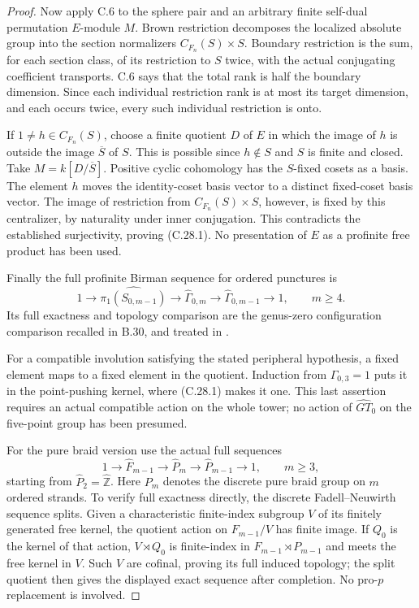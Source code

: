 \documentclass[11pt]{article}
\begin{document}
\begin{proof}
Now apply C.6 to the sphere pair and an arbitrary finite
self-dual permutation $E$-module $M$.  Brown restriction
decomposes the localized absolute group into the section
normalizers $C_{F_n}(S)\times S$.  Boundary restriction
is the sum, for each section class, of its restriction
to $S$ twice, with the actual conjugating coefficient
transports.  C.6 says that the total rank is half the
boundary dimension.  Since each individual restriction
rank is at most its target dimension, and each occurs
twice, every such individual restriction is onto.

If $1\ne h\in C_{F_n}(S)$, choose a finite quotient
$D$ of $E$ in which the image of $h$ is outside the
image $\overline S$ of $S$.  This is possible since
$h\notin S$ and $S$ is finite and closed.  Take
$M=k[D/\overline S]$.  Positive cyclic cohomology
has the $S$-fixed cosets as a basis.  The element $h$
moves the identity-coset basis vector to a distinct
fixed-coset basis vector.  The image of restriction
from $C_{F_n}(S)\times S$, however, is fixed by this
centralizer, by naturality under inner conjugation.
This contradicts the established surjectivity, proving
(C.28.1).  No presentation of $E$ as a profinite
free product has been used.

Finally the full profinite Birman sequence for ordered
punctures is
\[
 1\longrightarrow\widehat{\pi_1(S_{0,m-1})}
 \longrightarrow\widehat\Gamma_{0,m}
 \longrightarrow\widehat\Gamma_{0,m-1}
 \longrightarrow1,\qquad m\geq4 .
\]
Its full exactness and topology comparison are the
genus-zero configuration comparison recalled in B.30,
and treated in \cite{CEBoggiCongruence2020}.

For a compatible involution satisfying the stated
peripheral hypothesis, a fixed element maps to a
fixed element in the quotient.  Induction from
$\Gamma_{0,3}=1$ puts it in the point-pushing kernel,
where (C.28.1) makes it one.  This last assertion
requires an actual compatible action on the whole
tower; no action of $\widehat{GT}_0$ on the
five-point group has been presumed.

For the pure braid version use the actual full sequences
\[
 1\longrightarrow\widehat F_{m-1}
 \longrightarrow\widehat P_m
 \longrightarrow\widehat P_{m-1}
 \longrightarrow1,\qquad m\geq3,
\]
starting from $\widehat P_2=\widehat{\mathbb Z}$.
Here $P_m$ denotes the discrete pure braid group on
$m$ ordered strands.  To verify full exactness directly,
the discrete Fadell--Neuwirth sequence splits.  Given a
characteristic finite-index subgroup $V$ of its finitely
generated free kernel, the quotient action on $F_{m-1}/V$
has finite image.  If $Q_0$ is the kernel of that action,
$V\rtimes Q_0$ is finite-index in
$F_{m-1}\rtimes P_{m-1}$ and meets the free kernel in $V$.
Such $V$ are cofinal, proving its full induced topology;
the split quotient then gives the displayed exact sequence
after completion.  No pro-$p$ replacement is involved.


\end{proof}
\end{document}
